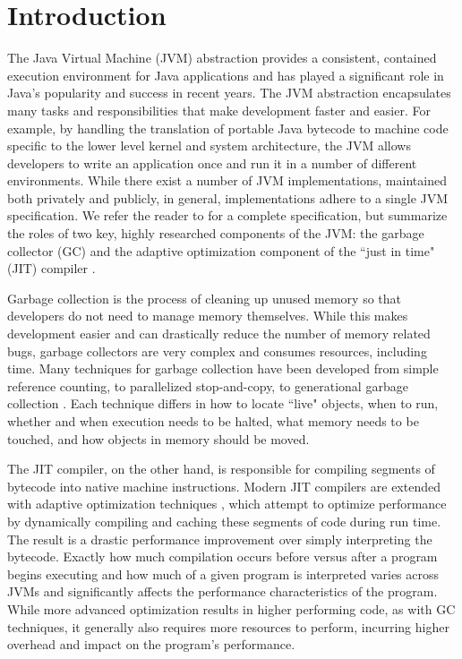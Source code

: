 \documentclass{sig-alternate}
\begin{document}



\section{Introduction}
\label{sec:introduction}
The Java Virtual Machine (JVM) abstraction provides a consistent, contained execution environment for Java applications and has played a significant role in Java's popularity and success in recent years. The JVM abstraction encapsulates many tasks and responsibilities that make development faster and easier. For example, by handling the translation of portable Java bytecode to machine code specific to the lower level kernel and system architecture, the JVM allows developers to write an application once and run it in a number of different environments. While there exist a number of JVM implementations, maintained both privately and publicly, in general, implementations adhere to a single JVM specification. We refer the reader to \cite{lindholm2014java} for a complete specification, but summarize the roles of two key, highly researched components of the JVM: the garbage collector (GC) and the adaptive optimization component of the ``just in time" (JIT) compiler \cite{hotspot:whitepaper}.

Garbage collection is the process of cleaning up unused memory so that developers do not need to manage memory themselves. While this makes development easier and can drastically reduce the number of memory related bugs, garbage collectors are very complex and consumes resources, including time. Many techniques for garbage collection have been developed from simple reference counting, to parallelized stop-and-copy, to generational garbage collection \cite{lins1996garbage}. Each technique differs in how to locate ``live" objects, when to run, whether and when execution needs to be halted, what memory needs to be touched, and how objects in memory should be moved.

The JIT compiler, on the other hand, is responsible for compiling segments of bytecode into native machine instructions. Modern JIT compilers are extended with adaptive optimization techniques \cite{suganuma2001dynamic}, which attempt to optimize performance by dynamically compiling and caching these segments of code during run time. The result is a drastic performance improvement over simply interpreting the bytecode. Exactly how much compilation occurs before versus after a program begins executing and how much of a given program is interpreted varies across JVMs and significantly affects the performance characteristics of the program. While more advanced optimization results in higher performing code, as with GC techniques, it generally also requires more resources to perform, incurring higher overhead and impact on the program's performance.
\end{document}
